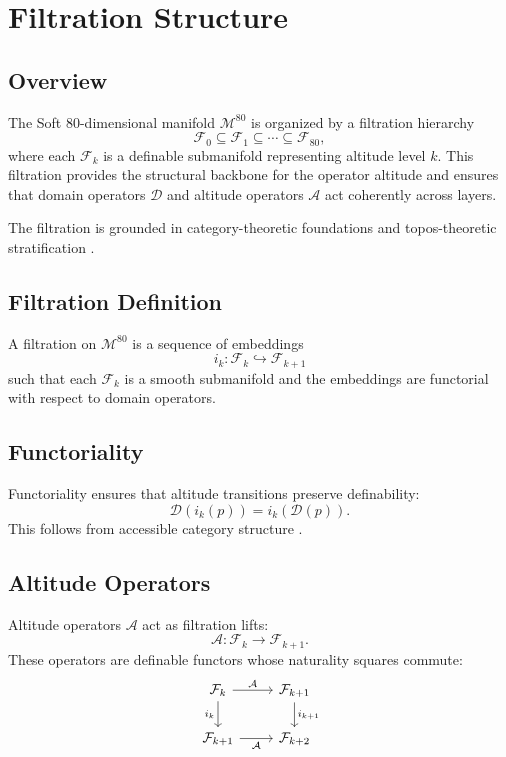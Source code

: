 
\section{Filtration Structure}
\label{sec:FiltrationStructure}

\subsection{Overview}
The Soft 80-dimensional manifold $\mathcal{M}^{80}$ is organized by a
filtration hierarchy
\[
\mathcal{F}_0 \subseteq \mathcal{F}_1 \subseteq \cdots \subseteq \mathcal{F}_{80},
\]
where each $\mathcal{F}_k$ is a definable submanifold representing altitude
level $k$. This filtration provides the structural backbone for the operator
altitude and ensures that domain operators $\mathcal{D}$ and altitude operators
$\mathcal{A}$ act coherently across layers.

The filtration is grounded in category-theoretic foundations
 and topos-theoretic
stratification .

\subsection{Filtration Definition}
\begin{definition}[Filtration]
A filtration on $\mathcal{M}^{80}$ is a sequence of embeddings
\[
i_k : \mathcal{F}_k \hookrightarrow \mathcal{F}_{k+1}
\]
such that each $\mathcal{F}_k$ is a smooth submanifold and the embeddings are
functorial with respect to domain operators.
\end{definition}

\subsection{Functoriality}
Functoriality ensures that altitude transitions preserve definability:
\[
\mathcal{D}(i_k(p)) = i_k(\mathcal{D}(p)).
\]
This follows from accessible category structure
.

\subsection{Altitude Operators}
Altitude operators $\mathcal{A}$ act as filtration lifts:
\[
\mathcal{A} : \mathcal{F}_k \to \mathcal{F}_{k+1}.
\]
These operators are definable functors whose naturality squares commute:
\[
\begin{tikzcd}
\mathcal{F}_k \arrow[r,"\mathcal{A}"] \arrow[d,"i_k"']
& \mathcal{F}_{k+1} \arrow[d,"i_{k+1}"] \\
\mathcal{F}_{k+1} \arrow[r,"\mathcal{A}"']
& \mathcal{F}_{k+2}
\end{tikzcd}
\]

